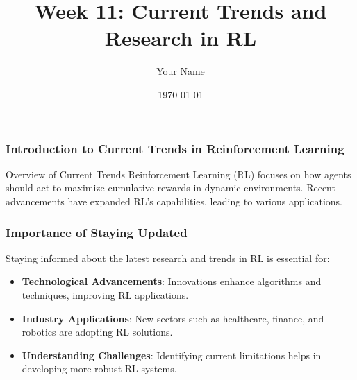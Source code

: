 \documentclass{beamer}
\title{Week 11: Current Trends and Research in RL}
\author{Your Name}
\institute{Your Institution}
\date{\today}
\begin{document}
\frame{\titlepage}

\begin{frame}[fragile]
    \frametitle{Introduction to Current Trends in Reinforcement Learning}
    \begin{block}{Overview of Current Trends}
        Reinforcement Learning (RL) focuses on how agents should act to maximize cumulative rewards in dynamic environments. Recent advancements have expanded RL's capabilities, leading to various applications.
    \end{block}
\end{frame}

\begin{frame}[fragile]
    \frametitle{Importance of Staying Updated}
    Staying informed about the latest research and trends in RL is essential for:
    \begin{itemize}
        \item \textbf{Technological Advancements}: Innovations enhance algorithms and techniques, improving RL applications.
        \item \textbf{Industry Applications}: New sectors such as healthcare, finance, and robotics are adopting RL solutions.
        \item \textbf{Understanding Challenges}: Identifying current limitations helps in developing more robust RL systems.
    \end{itemize}
\end{frame}
\end{document}

